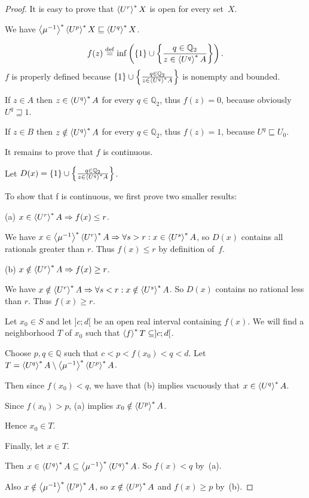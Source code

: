 \begin{proof}
It is easy to prove that $\left\langle U^r\right\rangle ^{\ast}X$ is open for every set~$X$.

We have $\left\langle \mu^{-1}\right\rangle ^{\ast}\left\langle U^p\right\rangle ^{\ast}X\sqsubseteq\left\langle U^q\right\rangle ^{\ast}X$.

\[ f (z) \overset{\mathrm{def}}{=} \inf \left( \{ 1 \} \cup \left\{ \frac{ q \in
   \mathbb{Q}_2 }{ z \in \left\langle U^q\right\rangle ^{\ast}
   A }\right\} \right). \]
$f$ is properly defined because $\{ 1 \} \cup \left\{ \frac{ q \in \mathbb{Q}_2
}{ z \in \left\langle U^q\right\rangle ^{\ast} A }\right\}$ is
nonempty and bounded.

If $z \in A$ then $z \in \left\langle U^q\right\rangle ^{\ast} A$ for every $q \in
\mathbb{Q}_2$, thus $f (z) = 0$, because obviously $U^q \sqsupseteq 1$.

If $z \in B$ then $z \notin \left\langle U^q\right\rangle ^{\ast} A$ for every $q \in
\mathbb{Q}_2$, thus $f (z) = 1$, because $U^q \sqsubseteq U_0$.

It remains to prove that $f$ is continuous.

Let $D (x) = \{ 1 \} \cup \left\{ \frac{ q \in \mathbb{Q}_2 }{
z \in \left\langle U^q\right\rangle ^{\ast} A }\right\}$.

To show that f is continuous, we first prove two smaller results:

(a) $x\in\left\langle U^r\right\rangle ^{\ast}A \Rightarrow f(x)\leq r$.

We have $x\in\left\langle \mu^{-1}\right\rangle ^{\ast}\left\langle U^r\right\rangle ^{\ast}A \Rightarrow \forall s>r:x\in\left\langle U^s\right\rangle ^{\ast}A$,
so $D(x)$ contains all rationals greater than $r$. Thus $f(x)\leq r$ by definition of~$f$.

(b) $x\notin\left\langle U^r\right\rangle ^{\ast}A \Rightarrow f(x)\geq r$.

We have $x\notin\left\langle U^r\right\rangle ^{\ast}A \Rightarrow \forall s<r:x\notin\left\langle U^s\right\rangle ^{\ast}A$.
So $D(x)$ contains no rational less than $r$. Thus $f(x)\geq r$.

Let $x_0\in S$ and let $]c;d[$ be an open real interval containing $f(x)$.
We will find a neighborhood $T$ of $x_0$ such that $\left\langle f\right\rangle ^{\ast}T\subseteq]c;d[$.

Choose $p,q\in\mathbb{Q}$ such that $c < p < f(x_0) < q < d$. Let $T=\left\langle U^q\right\rangle ^{\ast}A\setminus\left\langle \mu^{-1}\right\rangle ^{\ast}\left\langle U^p\right\rangle ^{\ast}A$.

Then since $f(x_0)<q$, we have that (b) implies vacuously that $x\in\left\langle U^q\right\rangle ^{\ast}A$.

Since $f(x_0)>p$, (a) implies $x_0\notin\left\langle U^p\right\rangle ^{\ast}A$.

Hence $x_0\in T$.

Finally, let $x\in T$.

Then $x\in\left\langle U^q\right\rangle ^{\ast}A\subseteq\left\langle \mu^{-1}\right\rangle ^{\ast}\left\langle U^q\right\rangle ^{\ast}A$. So $f(x)<q$ by~(a).

Also $x\notin\left\langle \mu^{-1}\right\rangle ^{\ast}\left\langle U^p\right\rangle ^{\ast}A$, so $x\notin\left\langle U^p\right\rangle ^{\ast}A$ and $f(x)\geq p$ by~(b).


\end{proof}
